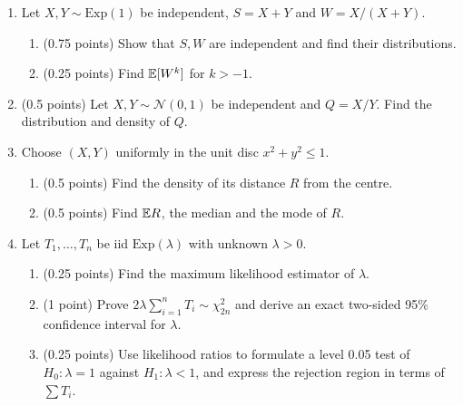 \documentclass[a4paper]{report}
\begin{document}
\begin{problem}
\begin{enumerate}
\item Let $X,Y\sim\mathrm{Exp}(1)$ be independent, $S=X+Y$ and $W=X/(X+Y)$.
\begin{enumerate}
\item (0.75 points) Show that $S,W$ are independent and find their distributions.
\item (0.25 points) Find $\mathbb {E}[W^k]$ for $k>-1$.
\end{enumerate}
\item (0.5 points) Let $X,Y\sim\mathcal N(0,1)$ be independent and $Q=X/Y$. Find the distribution and density of $Q$.
\item Choose $(X,Y)$ uniformly in the unit disc $x^2+y^2\leq1$.
\begin{enumerate}
\item (0.5 points) Find the density of its distance $R$ from the centre.
\item (0.5 points) Find $\mathbb {E} R$, the median and the mode of $R$.
\end{enumerate}
\item Let $T_1,\ldots,T_n$ be iid $\mathrm{Exp}(\lambda)$ with unknown $\lambda>0$.
\begin{enumerate}
\item (0.25 points) Find the maximum likelihood estimator of $\lambda$.
\item (1 point) Prove $2\lambda\sum_{i=1}^nT_i\sim\chi^2_{2n}$ and derive an exact two-sided 95\% confidence interval for $\lambda$.
\item (0.25 points) Use likelihood ratios to formulate a level 0.05 test of $H_0:\lambda=1$ against $H_1:\lambda<1$, and express the rejection region in terms of $\sum T_i$.
\end{enumerate}
\end{enumerate}
\end{problem}
\end{document}
